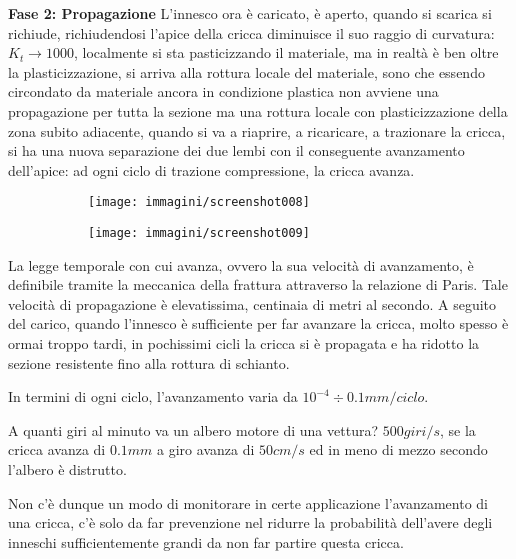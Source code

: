 \documentclass{article}
\begin{document}
\begin{adjustwidth}{2in}{}
		\textbf{Fase 2: Propagazione}\newline
		L'innesco ora è caricato, è aperto, quando si scarica si richiude, richiudendosi l'apice della cricca diminuisce il suo raggio di curvatura: $K_t\rightarrow1000$, localmente si sta pasticizzando il materiale, ma in realtà è ben oltre la plasticizzazione, si arriva  alla rottura locale del materiale, sono che essendo circondato da materiale ancora in condizione plastica non avviene una propagazione per tutta la sezione ma una rottura locale con plasticizzazione della zona subito adiacente, quando si va a riaprire, a ricaricare, a trazionare la cricca, si ha una nuova separazione dei due lembi con il conseguente avanzamento dell'apice: ad ogni ciclo di trazione compressione, la cricca avanza.
		\begin{figure}[H]
			\centering
			\begin{subfigure}{0.5\textwidth}
				\centering
			\texttt{[image: immagini/screenshot008]}
\label{fig:screenshot008}
			\end{subfigure}%
			\begin{subfigure}{0.5\textwidth}
				\centering
			\texttt{[image: immagini/screenshot009]}
\label{fig:screenshot009}
			\end{subfigure}
		\end{figure}
		
		La legge temporale con cui avanza, ovvero la sua velocità di avanzamento, è definibile tramite la meccanica della frattura attraverso la relazione di Paris. Tale velocità di propagazione è elevatissima, centinaia di metri al secondo. A seguito del carico, quando l'innesco è sufficiente per far avanzare la cricca, molto spesso è ormai troppo tardi, in  pochissimi cicli la cricca si è propagata e ha ridotto la sezione resistente fino alla rottura di schianto. 
		
		In termini di  ogni ciclo, l'avanzamento  varia da $10^{-4}\div0.1 mm/ciclo$. 
		
		A quanti giri al minuto va un albero motore di una vettura? $ 500giri/s $, se la cricca avanza di $ 0.1 mm $ a giro avanza di $ 50 cm/s $ ed in meno di mezzo secondo l'albero è distrutto. 
		
		Non c'è dunque un modo di monitorare in certe applicazione l'avanzamento di una cricca, c'è solo da far prevenzione nel ridurre la probabilità dell'avere degli inneschi sufficientemente grandi da non far partire questa cricca.\newline  
		

\end{adjustwidth}
\end{document}
